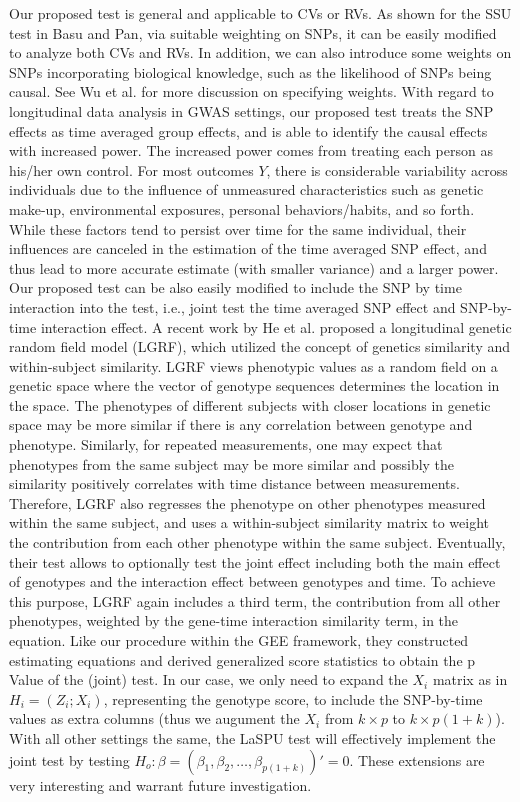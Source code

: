 \documentclass[12pt]{article}
\begin{document}
Our proposed test is general and applicable to CVs or RVs. As shown for the SSU test in Basu and Pan,\cite{Basu2011} via suitable weighting on SNPs, it can be easily modified to analyze both CVs and RVs. In addition, we can also introduce some weights on SNPs incorporating biological knowledge, such as the likelihood of SNPs being causal. See Wu et al.\cite{Wu2011} for more discussion on specifying weights. With regard to longitudinal data analysis in GWAS settings, our proposed test treats the SNP effects as time averaged group effects, and is able to identify the causal effects with increased power. The increased power comes from treating each person as his/her own control. For most outcomes $Y$, there is considerable variability across individuals due to the influence of unmeasured characteristics such as genetic make-up, environmental exposures, personal behaviors/habits, and so forth. While these factors tend to persist over time for the same individual, their influences are canceled in the estimation of the time averaged SNP effect, and thus lead to more accurate estimate (with smaller variance) and a larger power. Our proposed test can be also easily modified to include the SNP by time interaction into the test, i.e., joint test the time averaged SNP effect and SNP-by-time interaction effect. A recent work by He et al.\cite{He2015} proposed a longitudinal genetic random field model (LGRF), which utilized the concept of genetics similarity and within-subject similarity. LGRF views phenotypic values as a random field on a genetic space where the vector of genotype sequences determines the location in the space. The phenotypes of different subjects with closer locations in genetic space may be more similar if there is any correlation between genotype and phenotype. Similarly, for repeated measurements, one may expect that phenotypes from the same subject may be more similar and possibly the similarity positively correlates with time distance between measurements. Therefore, LGRF also regresses the phenotype on other phenotypes measured within the same subject, and uses a within-subject similarity matrix to weight the contribution from each other phenotype within the same subject. Eventually, their test allows to optionally test the joint effect including both the main effect of genotypes and the interaction effect between genotypes and time. To achieve this purpose, LGRF again includes a third term, the contribution from all other phenotypes, weighted by the gene-time interaction similarity term, in the equation. Like our procedure within the GEE framework, they constructed estimating equations and derived generalized score statistics to obtain the p Value of the (joint) test. In our case, we only need to expand the $X_i$ matrix as in $H_i = (Z_i;X_i)$, representing the genotype score, to include the SNP-by-time values as extra columns (thus we augument the $X_i$ from $k \times p$ to $k \times p(1+k)$). With all other settings the same, the LaSPU test will effectively implement the joint test by testing  $H_{o}:\beta=(\beta_{1},\beta_{2},\ldots,\beta_{p(1+k)})'=0$. These extensions are very interesting and warrant future investigation.  
\end{document}
